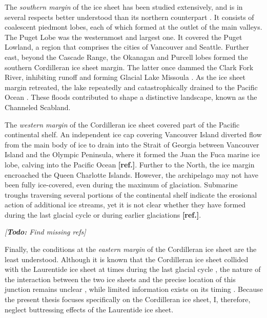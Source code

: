 \documentclass{article}
\newcommand{\todo}[1]{\emph{[\textbf{Todo:} #1]}}
\newcommand{\mref}[0]{\textbf{[ref.]}}
\begin{document}
The \emph{southern margin} of the ice sheet has been studied extensively, and
is in several respects better understood than its northern counterpart
\citep{Booth.etal.2003}. It consists of coalescent piedmont lobes, each of
which formed at the outlet of the main valleys. The Puget Lobe
\citep{Thorson.1980, Porter.Swanson.1998} was the westernmost and largest one.
It covered the Puget Lowland, a region that comprises the cities of Vancouver
and Seattle. Further east, beyond the Cascade Range, the Okanagan and Purcell
lobes formed the southern Cordilleran ice sheet margin. The latter once dammed
the Clark Fork River, inhibiting runoff and forming Glacial Lake Missoula
\citep{Pardee.1910}. As the ice sheet margin retreated, the lake repeatedly and
catastrophically drained to the Pacific Ocean \citep{Bretz.1923,Waitt.1980}.
These floods contributed to shape a distinctive landscape, known as the
Channeled Scabland.

The \emph{western margin} of the Cordilleran ice sheet covered part of the
Pacific continental shelf. An independent ice cap covering Vancouver Island
diverted flow from the main body of ice to drain into the Strait of Georgia
between Vancouver Island and the Olympic Peninsula, where it formed the Juan
the Fuca marine ice lobe, calving into the Pacific Ocean \mref. Further to the
North, the ice margin encroached the Queen Charlotte Islands. However, the
archipelago may not have been fully ice-covered, even during the maximum of
glaciation. Submarine troughs traversing several portions of the continental
shelf indicate the erosional action of additional ice streams, yet it is not
clear whether they have formed during the last glacial cycle or during earlier
glaciations \mref.

\todo{Find missing refs}

Finally, the conditions at the \emph{eastern margin} of the Cordilleran ice
sheet are the least understood. Although it is known that the Cordilleran ice
sheet collided with the Laurentide ice sheet at times during the last glacial
cycle \citep[e.g.][]{Margold.etal.2013, Margold.etal.2013a}, the nature of the
interaction between the two ice sheets and the precise location of this
junction remains unclear \citep{Gowan.2013}, while limited information exists
on its timing \citep[e.g.][]{Jackson.etal.1997, Bednarski.Smith.2007}. Because
the present thesis focuses specifically on the Cordilleran ice sheet, I,
therefore, neglect buttressing effects of the Laurentide ice sheet.
\end{document}
